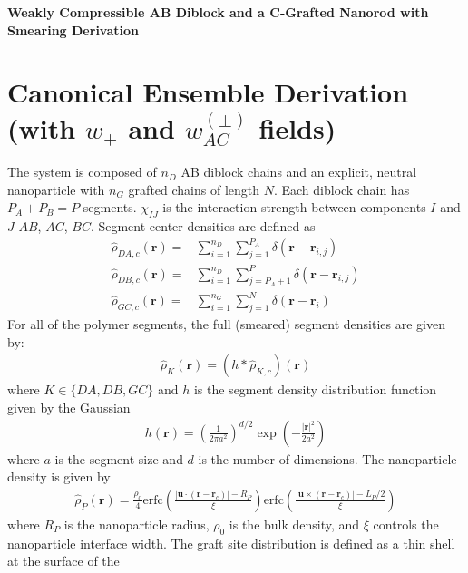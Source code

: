 \documentclass{article}
\begin{document}
\begin{center}
  \textbf{Weakly Compressible AB Diblock and a C-Grafted Nanorod with
  Smearing Derivation}
\end{center}

\section{Canonical Ensemble Derivation (with $w_+$ and $w_{AC}^{(\pm)}$ fields)}

The system is composed of $n_D$ AB diblock chains and an explicit, neutral
  nanoparticle with $n_G$ grafted chains of length $N$.
Each diblock chain has $P_A + P_B = P$ segments.
$\chi_{IJ}$ is the interaction strength between components $I$ and $J$
  $AB$, $AC$, $BC$.
Segment center densities are defined as
\begin{align*}
  \hat{\rho}_{DA,c} (\mathbf{r}) =&
    \sum_{i=1}^{n_D} \sum_{j=1}^{P_A}
    \delta(\mathbf{r} - \mathbf{r}_{i,j}) \\
  \hat{\rho}_{DB,c} (\mathbf{r}) =&
    \sum_{i=1}^{n_D} \sum_{j=P_A+1}^{P}
    \delta(\mathbf{r} - \mathbf{r}_{i,j}) \\
  \hat{\rho}_{GC,c} (\mathbf{r}) =&
    \sum_{i=1}^{n_G} \sum_{j=1}^{N}
    \delta(\mathbf{r} - \mathbf{r}_i)
\end{align*}
For all of the polymer segments, the full (smeared) segment densities are given
  by:
\begin{align*}
  \hat{\rho}_K(\mathbf{r}) = (h \ast \hat{\rho}_{K,c})(\mathbf{r})
\end{align*}
where $K \in \{ DA, DB, GC\}$ and $h$ is the segment density distribution
  function given by the Gaussian
\begin{align*}
  h(\mathbf{r}) = \left( \frac{1}{2\pi a^2} \right)^{d/2}
  \exp \left( - \frac{|\mathbf{r}|^2}{2a^2}  \right)
\end{align*}
where $a$ is the segment size and $d$ is the number of dimensions.
The nanoparticle density is given by
\begin{align*}
  \hat{\rho}_P(\mathbf{r}) =
    \frac{\rho_0}{4}
    \textrm{erfc} \left(
      \frac{|\mathbf{u} \cdot (\mathbf{r} - \mathbf{r}_c)| - R_P}{\xi} 
    \right)
    \textrm{erfc} \left(
      \frac{|\mathbf{u} \times (\mathbf{r} - \mathbf{r}_c)| - L_P/2}{\xi}       
    \right)
\end{align*}
where $R_P$ is the nanoparticle radius, $\rho_0$ is the bulk density,
  and $\xi$ controls the nanoparticle interface width.
The graft site distribution is defined as a thin shell at the surface of the
\end{document}
